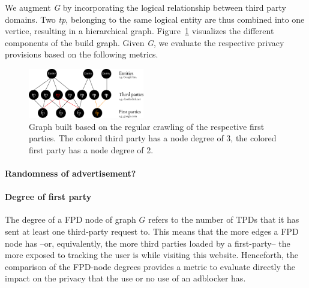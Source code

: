 \documentclass{sig-alternate}
\begin{document}
We augment \emph{G} by incorporating the logical relationship between third party domains. Two \emph{tp}, belonging to the same logical entity are thus combined into one vertice, resulting in a hierarchical graph. Figure~\ref{fig:graph} visualizes the different components of the build graph. Given \emph{G}, we evaluate the respective privacy provisions based on the following metrics.

\begin{figure}[htb!]
  \centering
  \includegraphics[width=0.45\textwidth]{figures/graph.eps}
  \caption{Graph built based on the regular crawling of the respective first parties. The colored third party has a node degree of 3, the colored first party has a node degree of 2.}\label{fig:graph}
\end{figure}

\paragraph{Randomness of advertisement?}

\paragraph{Degree of first party}
{\color{blue}The degree of a FPD node of graph $G$ refers to the number of TPDs that it has sent at least one third-party request to. This means that the more edges a FPD node has --or, equivalently, the more third parties loaded by a first-party-- the more exposed to tracking the user is while visiting this website. Henceforth, the comparison of the FPD-node degrees provides a metric to evaluate directly the impact on the privacy that the use or no use of an adblocker has.}
\end{document}
